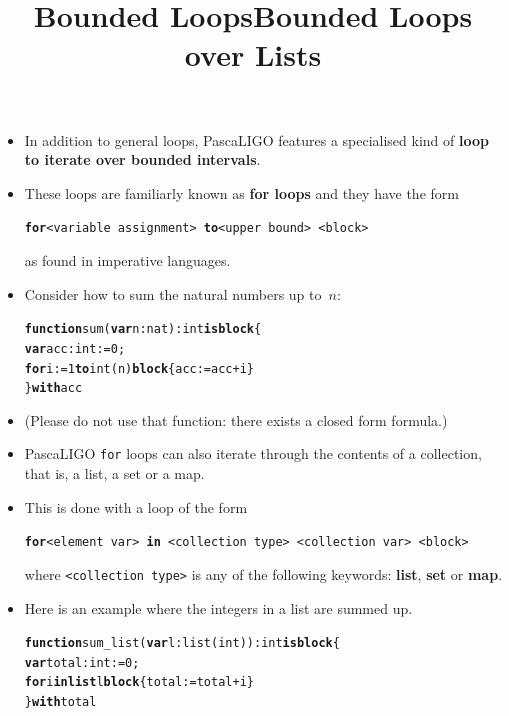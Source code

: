 \documentclass[wide]{slides}
\newcommand{\Kblock}[0]{\textbf{block}\xspace}
\newcommand{\Kfor}[0]{\textbf{for}\xspace}
\newcommand{\Kfunction}[0]{\textbf{function}\xspace}
\newcommand{\Kin}[0]{\textbf{in}\xspace}
\newcommand{\Kis}[0]{\textbf{is}\xspace}
\newcommand{\Klist}[0]{\textbf{list}\xspace}
\newcommand{\Kmap}[0]{\textbf{map}\xspace}
\newcommand{\Kset}[0]{\textbf{set}\xspace}
\newcommand{\Kto}[0]{\textbf{to}\xspace}
\newcommand{\Kvar}[0]{\textbf{var}\xspace}
\newcommand{\Kwith}[0]{\textbf{with}\xspace}
\begin{document}
\begin{slide}
  \title{Bounded Loops}

  \begin{itemize}

    \item In addition to general loops, PascaLIGO features a
      specialised kind of \textbf{loop to iterate over bounded
        intervals}.

    \item These loops are familiarly known as \textbf{for loops} and
      they have the form
      \begin{center}
        \texttt{\Kfor <variable assignment> \Kto <upper bound>
          <block>}
      \end{center}
      as found in imperative languages.

    \item Consider how to sum the natural numbers up to~\(n\):
      \begin{alltt}
\Kfunction sum (\Kvar n : nat) : int \Kis \Kblock \{
  \Kvar acc : int := 0;
  \Kfor i := 1 \Kto int (n) \Kblock \{ acc := acc + i \}
\} \Kwith acc
      \end{alltt}

      \item (Please do not use that function: there exists a closed
        form formula.)

  \end{itemize}

\end{slide}

\begin{slide}
  \title{Bounded Loops over Lists}

  \begin{itemize}

    \item PascaLIGO \texttt{for} loops can also iterate through the
      contents of a collection, that is, a list, a set or a map.

    \item This is done with a loop of the form
      \begin{center}
        \texttt{\Kfor <element var> \Kin
          <collection type> <collection var> <block>}
      \end{center}
      where \texttt{<collection type>} is any of the following
      keywords: \Klist, \Kset or \Kmap.

    \item Here is an example where the integers in a list are summed
      up.
      \begin{alltt}
\Kfunction sum_list (\Kvar l : list (int)) : int \Kis \Kblock \{
  \Kvar total : int := 0;
  \Kfor i \Kin \Klist l \Kblock \{ total := total + i \}
\} \Kwith total
      \end{alltt}

  \end{itemize}

\end{slide}
\end{document}
